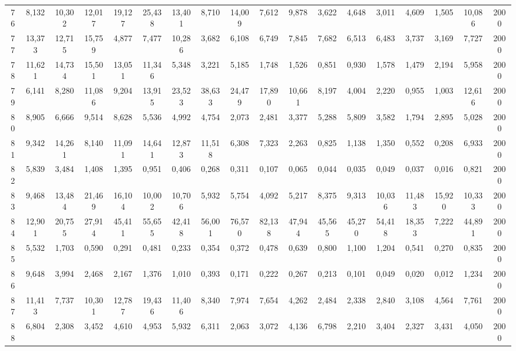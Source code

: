 {\begin{longtable}{ >{\tiny}cccccccccccccccccc}
76  & 8,132  & 10,302 & 12,017 & 19,127 & 25,438 & 13,401 & 8,710  & 14,009 & 7,612  & 9,878  & 3,622  & 4,648   & 3,011   & 4,609   & 1,505   & 10,086  & 2000 \\
77  & 13,373 & 12,715 & 15,759 & 4,877  & 7,477  & 10,286 & 3,682  & 6,108  & 6,749  & 7,845  & 7,682  & 6,513   & 6,483   & 3,737   & 3,169   & 7,727   & 2000 \\
78  & 11,621 & 14,734 & 15,501 & 13,051 & 11,346 & 5,348  & 3,221  & 5,185  & 1,748  & 1,526  & 0,851  & 0,930   & 1,578   & 1,479   & 2,194   & 5,958   & 2000 \\
79  & 6,141  & 8,280  & 11,086 & 9,204  & 13,915 & 23,523 & 38,633 & 24,479 & 17,890 & 10,661 & 8,197  & 4,004   & 2,220   & 0,955   & 1,003   & 12,616  & 2000 \\
80  & 8,905  & 6,666  & 9,514  & 8,628  & 5,536  & 4,992  & 4,754  & 2,073  & 2,481  & 3,377  & 5,288  & 5,809   & 3,582   & 1,794   & 2,895   & 5,028   & 2000 \\
81  & 9,342  & 14,261 & 8,140  & 11,091 & 14,641 & 12,873 & 11,518 & 6,308  & 7,323  & 2,263  & 0,825  & 1,138   & 1,350   & 0,552   & 0,208   & 6,933   & 2000 \\
82  & 5,839  & 3,484  & 1,408  & 1,395  & 0,951  & 0,406  & 0,268  & 0,311  & 0,107  & 0,065  & 0,044  & 0,035   & 0,049   & 0,037   & 0,016   & 0,821   & 2000 \\
83  & 9,468  & 13,484 & 21,469 & 16,104 & 10,002 & 10,706 & 5,932  & 5,754  & 4,092  & 5,217  & 8,375  & 9,313   & 10,036  & 11,483  & 15,920  & 10,333  & 2000 \\
84  & 12,901 & 20,755 & 27,914 & 45,411 & 55,655 & 42,418 & 56,001 & 76,570 & 82,138 & 47,944 & 45,565 & 45,270  & 54,418  & 18,353  & 7,222   & 44,891  & 2000 \\
85  & 5,532  & 1,703  & 0,590  & 0,291  & 0,481  & 0,233  & 0,354  & 0,372  & 0,478  & 0,639  & 0,800  & 1,100   & 1,204   & 0,541   & 0,270   & 0,835   & 2000 \\
86  & 9,648  & 3,994  & 2,468  & 2,167  & 1,376  & 1,010  & 0,393  & 0,171  & 0,222  & 0,267  & 0,213  & 0,101   & 0,049   & 0,020   & 0,012   & 1,234   & 2000 \\
87  & 11,413 & 7,737  & 10,301 & 12,787 & 19,436 & 11,406 & 8,340  & 7,974  & 7,654  & 4,262  & 2,484  & 2,338   & 2,840   & 3,108   & 4,564   & 7,761   & 2000 \\
88  & 6,804  & 2,308  & 3,452  & 4,610  & 4,953  & 5,932  & 6,311  & 2,063  & 3,072  & 4,136  & 6,798  & 2,210   & 3,404   & 2,327   & 3,431   & 4,050   & 2000 \\

\end{longtable}}
